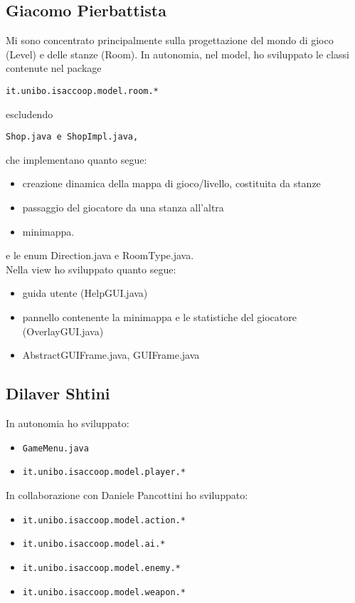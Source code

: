 \documentclass[a4paper,12pt]{report}
\begin{document}
\subsection*{Giacomo Pierbattista}
Mi sono concentrato principalmente sulla progettazione del mondo di gioco (Level) e delle stanze (Room).
In autonomia, nel model, ho sviluppato le classi contenute nel package 
\begin{verbatim}it.unibo.isaccoop.model.room.* \end{verbatim} escludendo
\begin{verbatim}Shop.java e ShopImpl.java, \end{verbatim}
che implementano quanto segue:
\begin{itemize}
    \item creazione dinamica della mappa di gioco/livello, costituita da stanze
    \item passaggio del giocatore da una stanza all'altra
    \item minimappa.
\end{itemize}
e le enum Direction.java e RoomType.java.
\\Nella view ho sviluppato quanto segue:
\begin{itemize}
    \item guida utente (HelpGUI.java)
    \item pannello contenente la minimappa e le statistiche del giocatore (OverlayGUI.java)
    \item AbstractGUIFrame.java, GUIFrame.java
\end{itemize}

\subsection*{Dilaver Shtini}
In autonomia ho sviluppato:
\begin{itemize}
    \item \begin{verbatim}GameMenu.java \end{verbatim}
    \item \begin{verbatim}it.unibo.isaccoop.model.player.* \end{verbatim}
\end{itemize}
In collaborazione con Daniele Pancottini ho sviluppato:
    \begin{itemize}
        \item \begin{verbatim}it.unibo.isaccoop.model.action.* \end{verbatim}
        \item \begin{verbatim}it.unibo.isaccoop.model.ai.* \end{verbatim}
        \item \begin{verbatim}it.unibo.isaccoop.model.enemy.* \end{verbatim}
        \item \begin{verbatim}it.unibo.isaccoop.model.weapon.* \end{verbatim}
    \end{itemize}
\end{document}
